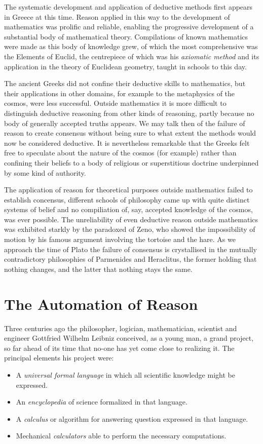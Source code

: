 The systematic development and application of deductive methods first appears in Greece at this time.
Reason applied in this way to the development of mathematics was prolific and reliable,
enabling the progressive development of a substantial body of mathematical theory.
Compilations of known mathematics were made as this body of knowledge grew,
of which the most comprehensive was the Elements of Euclid, the centrepiece of which
was his \emph{axiomatic method} and its application in the theory of Euclidean geometry,
taught in schools to this day.

The ancient Greeks did not confine their deductive skills to mathematics,
but their applications in other domains, for example to the metaphysics of the cosmos,
were less successful.
Outside mathematics it is more difficult to distinguish deductive reasoning from other
kinds of reasoning, partly because no body of generally accepted truths appears.
We may talk then of the failure of reason to create consensus without being sure to
what extent the methods would now be considered deductive.
It is nevertheless remarkable that the Greeks felt free to speculate about the
nature of the cosmos (for example) rather than confining their beliefs to a body
of religious or superstitious doctrine underpinned by some kind of authority.

The application of reason for theoretical purposes outside mathematics failed to
establish concensus, different schools of philosophy came up with quite distinct
systems of belief and no compiliation of, say, accepted knowledge of the cosmos,
was ever possible.
The unreliability of even deductive reason outside mathematics was exhibited
starkly by the paradoxed of Zeno, who showed the impossibility of motion by
his famous argument involving the tortoise and the hare. 
As we approach the time of Plato the failure of consensus is crystallised
in the mutually contradictory philosophies of Parmenides and Heraclitus,
the former holding that nothing changes, and the latter that nothing stays the same.

\section{The Automation of Reason}

Three centuries ago the philosopher, logician, mathematician,
scientist and engineer Gottfried Wilhelm Leibniz conceived, as a young
man, a grand project, so far ahead of its time that no-one has yet
come close to realizing it.
The principal elements his project were:
\begin{itemize}
\item A \emph{universal formal language} in which all scientific
  knowledge might be expressed.
\item An \emph{encyclopedia} of science formalized in that language.
\item A \emph{calculus} or algorithm for answering question expressed
  in that language.
\item Mechanical \emph{calculators} able to perform the necessary computations.
\end{itemize}

